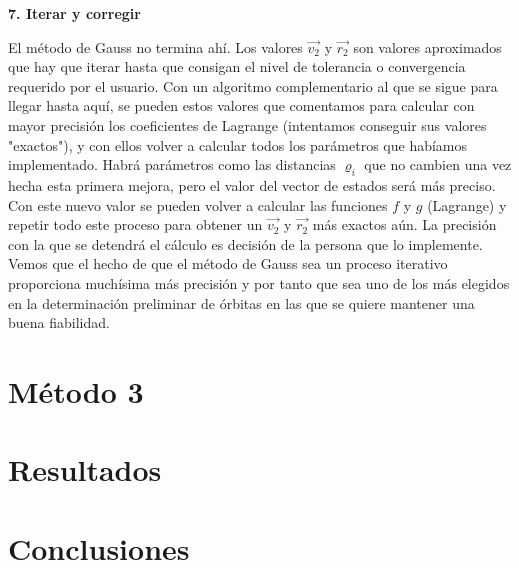 \documentclass{article}
\numberwithin{equation}{section}
\begin{document}
\noindent\textbf{7. Iterar y corregir}

El método de Gauss no termina ahí. Los valores $\overrightarrow{v_2}$ y $\overrightarrow{r_2}$ son valores aproximados que hay que iterar hasta que consigan el nivel de tolerancia o convergencia requerido por el usuario. Con un algoritmo complementario al que se sigue para llegar hasta aquí, se pueden estos valores que comentamos para calcular con mayor precisión los coeficientes de Lagrange (intentamos conseguir sus valores "exactos"), y con ellos volver a calcular todos los parámetros que habíamos implementado. Habrá parámetros como las distancias $\varrho_i$ que no cambien una vez hecha esta primera mejora, pero el valor del vector de estados será más preciso. Con este nuevo valor se pueden volver a calcular las funciones $f$ y $g$ (Lagrange) y repetir todo este proceso para obtener un $\overrightarrow{v_2}$ y $\overrightarrow{r_2}$ más exactos aún. La precisión con la que se detendrá el cálculo es decisión de la persona que lo implemente.\\

Vemos que el hecho de que el método de Gauss sea un proceso iterativo proporciona muchísima más precisión y por tanto que sea uno de los más elegidos en la determinación preliminar de órbitas en las que se quiere mantener una buena fiabilidad.



\section{Método 3} %
\section{Resultados} %
\section{Conclusiones} %
\end{document}
